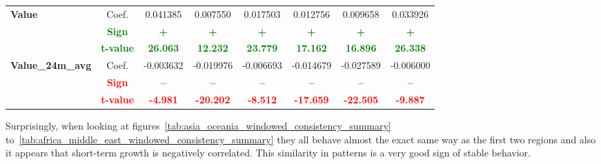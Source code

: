 \documentclass[11pt,english,a4paper,hidelinks]{book}
\begin{document}
\begin{table}[H]
\begin{tabular}{lccccccc}
        \multirow{3}{*}{\textbf{Value}}
            & Coef.   & 0.041385  & 0.007550  & 0.017503  & 0.012756  & 0.009658  & 0.033926  \\
            & \textbf{\textcolor{green}{Sign}}    & \textbf{\textcolor{green}{+}}        & \textbf{\textcolor{green}{+}}        & \textbf{\textcolor{green}{+}}        & \textbf{\textcolor{green}{+}}        & \textbf{\textcolor{green}{+}}        & \textbf{\textcolor{green}{+}}        \\
            & \textbf{\textcolor{green}{t-value}} & \textbf{\textcolor{green}{26.063}}   & \textbf{\textcolor{green}{12.232}}   & \textbf{\textcolor{green}{23.779}}   & \textbf{\textcolor{green}{17.162}}   & \textbf{\textcolor{green}{16.896}}   & \textbf{\textcolor{green}{26.338}}   \\
        \multirow{3}{*}{\textbf{Value\_24m\_avg}} 
            & Coef.   & -0.003632 & -0.019976 & -0.006693 & -0.014679 & -0.027589 & -0.006000 \\
            & \textbf{\textcolor{red}{Sign}}    & \textbf{\textcolor{red}{–}}         & \textbf{\textcolor{red}{–}}         & \textbf{\textcolor{red}{–}}         & \textbf{\textcolor{red}{–}}         & \textbf{\textcolor{red}{–}}         & \textbf{\textcolor{red}{–}}         \\
            & \textbf{\textcolor{red}{t-value}} & \textbf{\textcolor{red}{-4.981}}    & \textbf{\textcolor{red}{-20.202}}   & \textbf{\textcolor{red}{-8.512}}    & \textbf{\textcolor{red}{-17.659}}   & \textbf{\textcolor{red}{-22.505}}   & \textbf{\textcolor{red}{-9.887}}    \\
        \bottomrule
    \end{tabular}
    \label{tab:europe_windowed_consistency_summary}
\end{table}

\noindent Surprisingly, when looking at figures~\ref{tab:asia_oceania_windowed_consistency_summary} to~\ref{tab:africa_middle_east_windowed_consistency_summary} they all behave almost the exact same way as the first two regions and also it appears that short-term growth is negatively correlated. This similarity in patterns is a very good sign of stable behavior.
\end{document}
